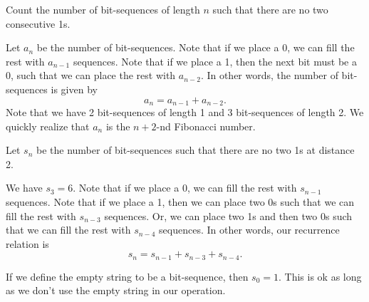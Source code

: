 \begin{eg}
	Count the number of bit-sequences of length \( n \) such that there are no two consecutive 1s.
\end{eg}

Let \( a_n \) be the number of bit-sequences. Note that if we place a 0, we can fill the rest with \( a_{n-1} \) sequences. Note that if we place a 1, then the next bit must be a 0, such that we can place the rest with \( a_{n-2} \). In other words, the number of bit-sequences is given by \[
	a_n = a_{n-1} + a_{n-2}
.\] Note that we have 2 bit-sequences of length 1 and 3 bit-sequences of length 2. We quickly realize that \( a_n \) is the \( n+2 \)-nd Fibonacci number.

\begin{eg}
	Let \( s_n \) be the number of bit-sequences such that there are no two 1s at distance 2.
\end{eg}

We have \( s_3=6 \). Note that if we place a 0, we can fill the rest with \( s_{n-1} \) sequences. Note that if we place a 1, then we can place two 0s such that we can fill the rest with \( s_{n-3} \) sequences. Or, we can place two 1s and then two 0s such that we can fill the rest with \( s_{n-4} \) sequences. In other words, our recurrence relation is \[
	s_n = s_{n-1} + s_{n-3} + s_{n-4}
.\] 

\begin{note}
	If we define the empty string to be a bit-sequence, then \( s_0=1 \). This is ok as long as we don't use the empty string in our operation.
\end{note}
